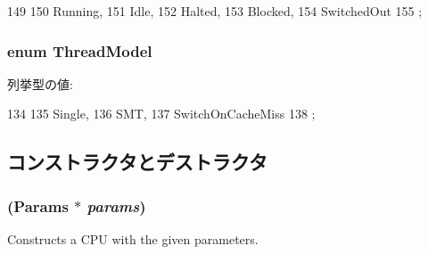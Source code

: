\begin{DoxyCode}
149                 {
150         Running,
151         Idle,
152         Halted,
153         Blocked,
154         SwitchedOut
155     };
\end{DoxyCode}
\hypertarget{classInOrderCPU_a27fc31cad7f14b3f31546056efddeaf1}{
\subsubsection[{ThreadModel}]{\setlength{\rightskip}{0pt plus 5cm}enum {\bf ThreadModel}}}
\label{classInOrderCPU_a27fc31cad7f14b3f31546056efddeaf1}
\begin{Desc}
\item[列挙型の値: ]\par
\begin{description}
\item[{\em 
\hypertarget{classInOrderCPU_a27fc31cad7f14b3f31546056efddeaf1a68168ddfb80052045df470955d649258}{
Single}
\label{classInOrderCPU_a27fc31cad7f14b3f31546056efddeaf1a68168ddfb80052045df470955d649258}
}]\item[{\em 
\hypertarget{classInOrderCPU_a27fc31cad7f14b3f31546056efddeaf1ad7ecd51555a027dd07c2d14f123bfe6c}{
SMT}
\label{classInOrderCPU_a27fc31cad7f14b3f31546056efddeaf1ad7ecd51555a027dd07c2d14f123bfe6c}
}]\item[{\em 
\hypertarget{classInOrderCPU_a27fc31cad7f14b3f31546056efddeaf1af15b471f97b68795dc1ed6ca9cac5ebc}{
SwitchOnCacheMiss}
\label{classInOrderCPU_a27fc31cad7f14b3f31546056efddeaf1af15b471f97b68795dc1ed6ca9cac5ebc}
}]\end{description}
\end{Desc}




\begin{DoxyCode}
134                      {
135         Single,
136         SMT,
137         SwitchOnCacheMiss
138     };
\end{DoxyCode}


\subsection{コンストラクタとデストラクタ}
\hypertarget{classInOrderCPU_abde8e8c7dd0ec0e51d67cc1ae67798d3}{
\subsubsection[{InOrderCPU}]{ ({\bf Params} $\ast$ {\em params})}}
\label{classInOrderCPU_abde8e8c7dd0ec0e51d67cc1ae67798d3}
Constructs a CPU with the given parameters. 


